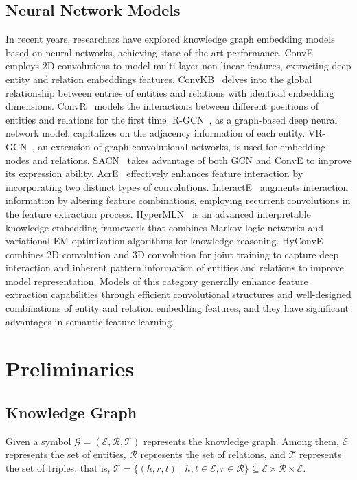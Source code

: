 \documentclass[letterpaper]{article} %
\begin{document}
\subsection{Neural Network Models}
In recent years, researchers have explored knowledge graph embedding models based on neural networks, achieving state-of-the-art performance. ConvE~\cite{ConvE} employs 2D convolutions to model multi-layer non-linear features, extracting deep entity and relation embeddings features. ConvKB~\cite{ConvKB} delves into the global relationship between entries of entities and relations with identical embedding dimensions. ConvR~\cite{ConvR} models the interactions between different positions of entities and relations for the first time. R-GCN~\cite{R-GCN}, as a graph-based deep neural network model, capitalizes on the adjacency information of each entity. VR-GCN~\cite{VRGCN}, an extension of graph convolutional networks, is used for embedding nodes and relations. SACN~\cite{SACN} takes advantage of both GCN and ConvE to improve its expression ability. AcrE~\cite{AcrE} effectively enhances feature interaction by incorporating two distinct types of convolutions. InteractE~\cite{InteractE} augments interaction information by altering feature combinations, employing recurrent convolutions in the feature extraction process. HyperMLN~\cite{HyperMLN} is an advanced interpretable knowledge embedding framework that combines Markov logic networks and variational EM optimization algorithms for knowledge reasoning. HyConvE~\cite{HyConvE} combines 2D convolution and 3D convolution for joint training to capture deep interaction and inherent pattern information of entities and relations to improve model representation. Models of this category generally enhance feature extraction capabilities through efficient convolutional structures and well-designed combinations of entity and relation embedding features, and they have significant advantages in semantic feature learning.



\section{Preliminaries}
\subsection{Knowledge Graph}
Given a symbol $\mathcal{G}=\left(\mathcal{E}, \mathcal{R}, \mathcal{T} \right)$ represents the knowledge graph. Among them, $\mathcal{E}$ represents the set of entities, $\mathcal{R}$ represents the set of relations, and $\mathcal{T}$ represents the set of triples, that is, $\mathcal{T}=\{(h, r, t) \mid h, t \in \mathcal{E}, r \in \mathcal{R}\} \subseteq \mathcal{E} \times \mathcal{R} \times \mathcal{E}$.
\end{document}
